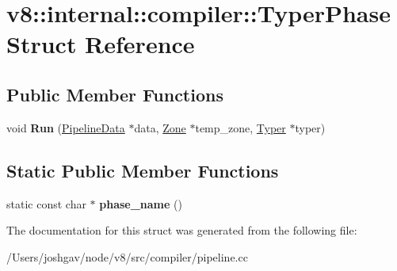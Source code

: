 \hypertarget{structv8_1_1internal_1_1compiler_1_1_typer_phase}{}\section{v8\+:\+:internal\+:\+:compiler\+:\+:Typer\+Phase Struct Reference}
\label{structv8_1_1internal_1_1compiler_1_1_typer_phase}
\subsection*{Public Member Functions}
\begin{DoxyCompactItemize}
\item 
void {\bfseries Run} (\hyperlink{classv8_1_1internal_1_1compiler_1_1_pipeline_data}{Pipeline\+Data} $\ast$data, \hyperlink{classv8_1_1internal_1_1_zone}{Zone} $\ast$temp\+\_\+zone, \hyperlink{classv8_1_1internal_1_1compiler_1_1_typer}{Typer} $\ast$typer)\hypertarget{structv8_1_1internal_1_1compiler_1_1_typer_phase_a1bc8b5908d828d140fb122ed7cbd50e6}{}\label{structv8_1_1internal_1_1compiler_1_1_typer_phase_a1bc8b5908d828d140fb122ed7cbd50e6}

\end{DoxyCompactItemize}
\subsection*{Static Public Member Functions}
\begin{DoxyCompactItemize}
\item 
static const char $\ast$ {\bfseries phase\+\_\+name} ()\hypertarget{structv8_1_1internal_1_1compiler_1_1_typer_phase_ac4354c06296428a0dae91e5259e25d6a}{}\label{structv8_1_1internal_1_1compiler_1_1_typer_phase_ac4354c06296428a0dae91e5259e25d6a}

\end{DoxyCompactItemize}


The documentation for this struct was generated from the following file\+:\begin{DoxyCompactItemize}
\item 
/\+Users/joshgav/node/v8/src/compiler/pipeline.\+cc\end{DoxyCompactItemize}

